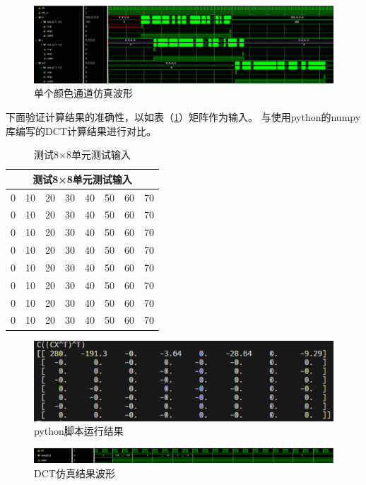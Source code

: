 \documentclass{article}
\numberwithin {equation}{section}
\begin{document}
\begin{spacing}{1.25}
      \begin{figure}[H]
        \centering
        \includegraphics[scale=0.275]{./pictures/dct_wave.png}
        \caption{单个颜色通道仿真波形}
        \label{single color channal}
      \end{figure}

    下面验证计算结果的准确性，以如表（\ref{testMatrix}）矩阵作为输入。
    与使用python的numpy库编写的DCT计算结果进行对比。
    \begin{table}[H]
      \caption{测试8×8单元测试输入}
      \label{testMatrix}
      \centering
      \begin{tabular}{cccccccc}
        \toprule
        \multicolumn{8}{c}{测试8×8单元测试输入}\\
        \midrule
        0 & 10 & 20 & 30 & 40 & 50 & 60 & 70 \\
        0 & 10 & 20 & 30 & 40 & 50 & 60 & 70 \\
        0 & 10 & 20 & 30 & 40 & 50 & 60 & 70 \\
        0 & 10 & 20 & 30 & 40 & 50 & 60 & 70 \\
        0 & 10 & 20 & 30 & 40 & 50 & 60 & 70 \\
        0 & 10 & 20 & 30 & 40 & 50 & 60 & 70 \\
        0 & 10 & 20 & 30 & 40 & 50 & 60 & 70 \\
        0 & 10 & 20 & 30 & 40 & 50 & 60 & 70 \\
        \bottomrule
      \end{tabular}
    \end{table}

    \begin{figure}[H]
      \centering
      \includegraphics[scale=0.8]{./pictures/python脚本运行结果.png}
      \caption{python脚本运行结果}
      \label{py result}
    \end{figure}
    \begin{figure}[H]
      \centering
      \includegraphics[scale=0.3725]{./pictures/DCTSimulationResult.png}
      \caption{ DCT仿真结果波形}
      \label{result simulation}
    \end{figure}


\end{spacing}
\end{document}
